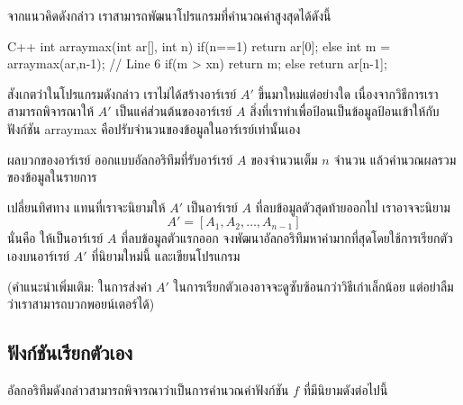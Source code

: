 จาก{\wbr}แนว{\wbr}คิด{\wbr}ดังกล่าว เรา{\wbr}สามารถ{\wbr}พัฒนา{\wbr}โปรแกรม{\wbr}ที่{\wbr}คำนวณ{\wbr}ค่าสูงสุด{\wbr}ได้{\wbr}ดังนี้{\wbr}

\latintext
\begin{codelist}{C++}{}
int arraymax(int ar[], int n)
{
  if(n==1)
    return ar[0];
  else {
    int m = arraymax(ar,n-1);   // Line 6
    if(m > xn)
      return m;
    else
      return ar[n-1];
  }
}
\end{codelist}
\thaitext

สังเกต{\wbr}ว่า{\wbr}ใน{\wbr}โปรแกรม{\wbr}ดังกล่าว เรา{\wbr}ไม่{\wbr}ได้{\wbr}สร้าง{\wbr}อาร์เรย์ $A'$ ขึ้น{\wbr}มา{\wbr}ใหม่{\wbr}แต่อย่างใด{\wbr}
เนื่องจาก{\wbr}วิธีการ{\wbr}เรา{\wbr}สามารถ{\wbr}พิจารณา{\wbr}ให้ $A'$ เป็น{\wbr}แค่{\wbr}ส่วน{\wbr}ต้น{\wbr}ของ{\wbr}อาร์เรย์ $A$
สิ่ง{\wbr}ที่{\wbr}เรา{\wbr}ทำ{\wbr}เพื่อ{\wbr}ป้อน{\wbr}เป็น{\wbr}ข้อมูล{\wbr}ป้อน{\wbr}เข้า{\wbr}ให้{\wbr}กับ{\wbr}ฟังก์ชัน {\ct arraymax}
คือ{\wbr}ปรับ{\wbr}จำนวน{\wbr}ของ{\wbr}ข้อมูล{\wbr}ใน{\wbr}อาร์เรย์{\wbr}เท่านั้น{\wbr}เอง{\wbr}

\begin{quiz}{ผลบวก{\wbr}ของ{\wbr}อาร์เรย์}
ออกแบบ{\wbr}อัล{\wbr}กอ{\wbr}ริ{\wbr}ทึม{\wbr}ที่{\wbr}รับ{\wbr}อาร์เรย์ $A$ ของ{\wbr}จำนวนเต็ม $n$ จำนวน{\wbr}
แล้ว{\wbr}คำนวณ{\wbr}ผลรวม{\wbr}ของ{\wbr}ข้อมูล{\wbr}ใน{\wbr}รายการ{\wbr}
\end{quiz}

\begin{quiz}{เปลี่ยน{\wbr}ทิศทาง}
แทน{\wbr}ที่{\wbr}เรา{\wbr}จะ{\wbr}นิยาม{\wbr}ให้ $A'$ เป็น{\wbr}อาร์เรย์ $A$ ที่{\wbr}ลบ{\wbr}ข้อมูล{\wbr}ตัว{\wbr}สุดท้าย{\wbr}ออก{\wbr}ไป เรา{\wbr}อาจ{\wbr}จะ{\wbr}นิยาม{\wbr}
\[
A'=[A_1,A_2,\ldots,A_{n-1}]
\]
นั่น{\wbr}คือ ให้{\wbr}เป็น{\wbr}อาร์เรย์ $A$ ที่{\wbr}ลบ{\wbr}ข้อมูล{\wbr}ตัว{\wbr}แรก{\wbr}ออก{\wbr}
จง{\wbr}พัฒนา{\wbr}อัล{\wbr}กอ{\wbr}ริ{\wbr}ทึม{\wbr}หา{\wbr}ค่า{\wbr}มาก{\wbr}ที่สุด{\wbr}โดย{\wbr}ใช้{\wbr}การ{\wbr}เรียก{\wbr}ตัวเอง{\wbr}บน{\wbr}อาร์เรย์ $A'$ ที่{\wbr}นิยาม{\wbr}ใหม่{\wbr}นี้{\wbr}
และ{\wbr}เขียน{\wbr}โปรแกรม{\wbr}

(คำแนะนำ{\wbr}เพิ่มเติม: ใน{\wbr}การ{\wbr}ส่ง{\wbr}ค่า $A'$ ใน{\wbr}การ{\wbr}เรียก{\wbr}ตัวเอง{\wbr}อาจ{\wbr}จะ{\wbr}ดู{\wbr}ซับซ้อน{\wbr}กว่า{\wbr}วิธี{\wbr}เก่า{\wbr}เล็กน้อย{\wbr}
แต่{\wbr}อย่า{\wbr}ลืม{\wbr}ว่า{\wbr}เรา{\wbr}สามารถ{\wbr}บวก{\wbr}พอยน์เตอร์{\wbr}ได้)
\end{quiz}



\subsection{ฟังก์ชัน{\wbr}เรียก{\wbr}ตัวเอง}
อัล{\wbr}กอ{\wbr}ริ{\wbr}ทึม{\wbr}ดังกล่าว{\wbr}สามารถ{\wbr}พิจารณา{\wbr}ว่า{\wbr}เป็น{\wbr}การ{\wbr}คำนวณ{\wbr}ค่า{\wbr}ฟังก์ชัน $f$ ที่{\wbr}มี{\wbr}นิยาม{\wbr}ดังต่อไปนี้{\wbr}

